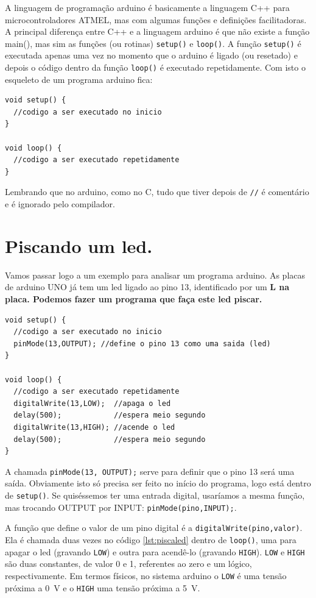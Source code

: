A linguagem de programação arduino é basicamente a linguagem C++ para microcontroladores ATMEL, mas com algumas funções e definições facilitadoras. A principal diferença entre C++ e a linguagem arduino é que não existe a função main(), mas sim as funções (ou rotinas) \lstinline|setup()| e \lstinline|loop()|. A função \lstinline|setup()| é executada apenas uma vez no momento que o arduino é ligado (ou resetado) e depois o código dentro da função \lstinline|loop()| é executado repetidamente. Com isto o esqueleto de um programa arduino fica:

\begin{lstlisting}[caption=Esqueleto de um programa arduino., label=lst:ardEsquel]
void setup() {
  //codigo a ser executado no inicio
}

void loop() {
  //codigo a ser executado repetidamente
}
 \end{lstlisting}

Lembrando que no arduino, como no C, tudo que tiver depois de \lstinline|//| é comentário e é ignorado pelo compilador.

\section{Piscando um led.}
Vamos passar logo a um exemplo para analisar um programa arduino. As placas de arduino UNO já tem um led ligado ao pino 13, identificado por um \bfseries{L} na placa. Podemos fazer um programa que faça este led piscar.

\begin{lstlisting}[caption= Programa para piscar led.,label=lst:piscaled]
void setup() {
  //codigo a ser executado no inicio
  pinMode(13,OUTPUT); //define o pino 13 como uma saida (led)
}

void loop() {
  //codigo a ser executado repetidamente
  digitalWrite(13,LOW);  //apaga o led
  delay(500);            //espera meio segundo
  digitalWrite(13,HIGH); //acende o led
  delay(500);            //espera meio segundo
}	
\end{lstlisting}

A chamada \lstinline|pinMode(13, OUTPUT);| serve para definir que o pino 13 será uma saída. Obviamente isto só precisa ser feito no início do programa, logo está dentro de \lstinline|setup()|. Se quiséssemos ter uma entrada digital, usaríamos a mesma função, mas trocando OUTPUT por INPUT: \lstinline|pinMode(pino,INPUT);|.

A função que define o valor de um pino digital é a \lstinline|digitalWrite(pino,valor)|. Ela é chamada duas vezes no código \ref{lst:piscaled} dentro de \lstinline|loop()|, uma para apagar o led (gravando \lstinline|LOW|) e outra para acendê-lo (gravando \lstinline|HIGH|). \lstinline|LOW| e \lstinline|HIGH| são duas constantes, de valor 0 e 1, referentes ao zero e um lógico, respectivamente. Em termos físicos, no sistema arduino o \lstinline|LOW| é uma tensão próxima a \SI{0}{V} e o \lstinline|HIGH| uma tensão próxima a \SI{5}{V}.

